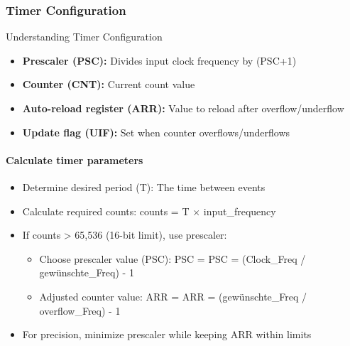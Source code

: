 \multend

\subsubsection{Timer Configuration}

\begin{concept}{Understanding Timer Configuration}
\begin{itemize}
    \item \textbf{Prescaler (PSC):} Divides input clock frequency by (PSC+1)
    \item \textbf{Counter (CNT):} Current count value
    \item \textbf{Auto-reload register (ARR):} Value to reload after overflow/underflow
    \item \textbf{Update flag (UIF):} Set when counter overflows/underflows
\end{itemize}

\paragraph{Calculate timer parameters}
\begin{itemize}
    \item Determine desired period (T): The time between events
    \item Calculate required counts: counts = T × input\_frequency
    \item If counts > 65,536 (16-bit limit), use prescaler:
    \begin{itemize}
        \item Choose prescaler value (PSC): PSC = PSC = (Clock\_Freq / gewünschte\_Freq) - 1
        \item Adjusted counter value: ARR = ARR = (gewünschte\_Freq / overflow\_Freq) - 1
    \end{itemize}
    \item For precision, minimize prescaler while keeping ARR within limits
\end{itemize}
\end{concept}


